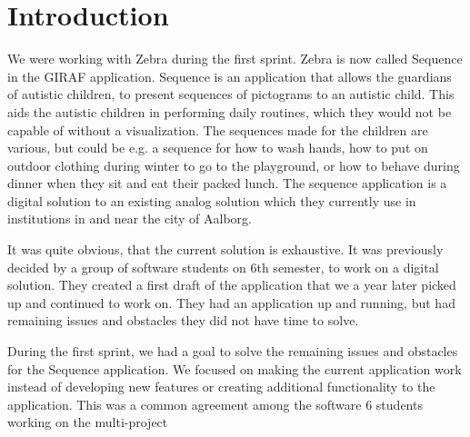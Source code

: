 \section{Introduction}
We were working with Zebra during the first sprint. Zebra is now called Sequence in the GIRAF application. Sequence is an application that allows the guardians of autistic children, to present sequences of pictograms to an autistic child. This aids the autistic children in performing daily routines, which they would not be capable of without a visualization. The sequences made for the children are various, but could be e.g. a sequence for how to wash hands, how to put on outdoor clothing during winter to go to the playground, or how to behave during dinner when they sit and eat their packed lunch. The sequence application is a digital solution to an existing analog solution which they currently use in institutions in and near the city of Aalborg.


It was quite obvious, that the current solution is exhaustive. It was previously decided by a group of software students on 6th semester, to work on a digital solution. They created a first draft of the application that we a year later picked up and continued to work on. They had an application up and running, but had remaining issues and obstacles they did not have time to solve.

During the first sprint, we had a goal to solve the remaining issues and obstacles for the Sequence application. We focused on making the current application work instead of developing new features or creating additional functionality to the application. This was a common agreement among the software 6 students working on the multi-project




